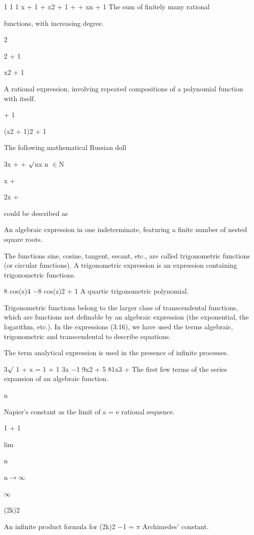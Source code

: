 \documentclass[11pt]{article}
\theoremstyle{plain}
\theoremstyle{definition}
\begin{document}
1 1 1 x + 1 + x2 + 1 + \textperiodcentered{} \textperiodcentered{} \textperiodcentered{} + xn + 1 The sum of finitely many rational

functions, with increasing degree.

2

2 + 1

x2 + 1

A rational expression, involving repeated compositions of a polynomial function with itself.

+ 1

(x2 + 1)2 + 1

The following mathematical Russian doll

3x + \textperiodcentered{} \textperiodcentered{} \textperiodcentered{} + $\surd$nx n $\in$N

x +

2x +

could be described as

An algebraic expression in one indeterminate, featuring a finite number of nested square roots.

The functions sine, cosine, tangent, secant, etc., are called trigonometric functions (or circular functions). A trigonometric expression is an expression containing trigonometric functions.

8 cos(z)4 $-$8 cos(z)2 + 1 A quartic trigonometric polynomial.

Trigonometric functions belong to the larger class of transcendental functions, which are functions not definable by an algebraic expression (the exponential, the logarithm, etc.). In the expressions (3.16), we have used the terms algebraic, trigonometric and transcendental to describe equations.

The term analytical expression is used in the presence of infinite processes.

3$\surd$ 1 + x = 1 + 1 3x $-$1 9x2 + 5 81x3 + \textperiodcentered{} \textperiodcentered{} \textperiodcentered{} The first few terms of the series expansion of an algebraic function.

n

Napier's constant as the limit of a = e rational sequence.

1 + 1

lim

n

n$\to$$\infty$

$\infty$

(2k)2

An infinite product formula for (2k)2 $-$1 = $\pi$ Archimedes$'$ constant.
\end{document}
